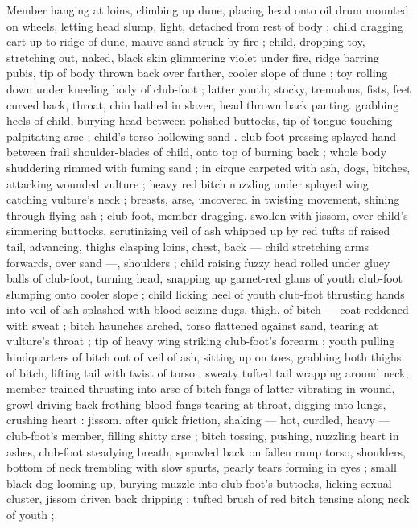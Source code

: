 Member hanging at loins, climbing up dune, placing head onto oil 
drum mounted on wheels, letting head slump, light, detached from 
rest of body ; child dragging cart up to ridge of dune, mauve sand 
struck by fire ; child, dropping toy, stretching out, naked, black skin 
glimmering violet under fire, ridge barring pubis, tip of body thrown 
back over farther, cooler slope of dune ; toy rolling down under 
kneeling body of club-foot ; latter youth; stocky, tremulous, fists, feet 
curved back, throat, chin bathed in slaver, head thrown back panting. 
grabbing heels of child, burying head between polished buttocks, tip 
of tongue touching palpitating arse ; child's torso hollowing sand . 
club-foot pressing splayed hand between frail shoulder-blades of 
child, onto top of burning back ; whole body shuddering rimmed with 
fuming sand ; in cirque carpeted with ash, dogs, bitches, attacking 
wounded vulture ; heavy red bitch nuzzling under splayed wing. 
catching vulture's neck ; breasts, arse, uncovered in twisting 
movement, shining through flying ash ; club-foot, member dragging. 
swollen with jissom, over child's simmering buttocks, scrutinizing veil 
of ash whipped up by red tufts of raised tail, advancing, thighs 
clasping loins, chest, back --- child stretching arms forwards, over 
sand ---, shoulders ; child raising fuzzy head rolled under gluey balls 
of club-foot, turning head, snapping up garnet-red glans of youth 
club-foot slumping onto cooler slope ; child licking heel of youth 
club-foot thrusting hands into veil of ash splashed with blood 
seizing dugs, thigh, of bitch --- coat reddened with sweat ; bitch 
haunches arched, torso flattened against sand, tearing at vulture's 
throat ; tip of heavy wing striking club-foot's forearm ; youth pulling 
hindquarters of bitch out of veil of ash, sitting up on toes, grabbing 
both thighs of bitch, lifting tail with twist of torso ; sweaty tufted tail 
wrapping around neck, member trained thrusting into arse of bitch 
fangs of latter vibrating in wound, growl driving back frothing blood 
fangs tearing at throat, digging into lungs, crushing heart : jissom. 
after quick friction, shaking --- hot, curdled, heavy --- club-foot's 
member, filling shitty arse ; bitch tossing, pushing, nuzzling heart in 
ashes, club-foot steadying breath, sprawled back on fallen rump 
torso, shoulders, bottom of neck trembling with slow spurts, pearly 
tears forming in eyes ; small black dog looming up, burying muzzle 
into club-foot's buttocks, licking sexual cluster, jissom driven back 
dripping ; tufted brush of red bitch tensing along neck of youth ; 
